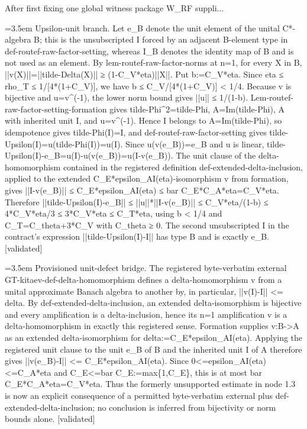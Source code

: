 \documentclass{article}
\newcommand{\step}[1]{\par\noindent\hangindent=3.5em\hangafter=1%
  \makebox[3.5em][l]{\textbf{#1.}}}
\newcommand{\steptag}[1]{\hfill{\small\textsf{[#1]}}}
\begin{document}
\begin{proofbox}{After first fixing one global witness package W\_RF suppli...}
\step{1.3} Upsilon-unit branch. Let e\_B denote the unit element of the unital C*-algebra B; this is the unsubscripted I forced by an adjacent B-element type in def-routef-raw-factor-setting, whereas I\_B denotes the identity map of B and is not used as an element. By lem-routef-raw-factor-norms at n=1, for every X in B, ||v(X)||=||tilde-Delta(X)|| ≥ (1-C\_V*eta)||X||. Put b:=C\_V*eta. Since eta ≤ rho\_T ≤ 1/[4*(1+C\_V)], we have b ≤ C\_V/[4*(1+C\_V)] < 1/4. Because v is bijective and u=v\textasciicircum{}(-1), the lower norm bound gives ||u|| ≤ 1/(1-b). Lem-routef-raw-factor-setting-formation gives tilde-Phi\textasciicircum{}2=tilde-Phi, A=Im(tilde-Phi), A with inherited unit I, and u=v\textasciicircum{}(-1). Hence I belongs to A=Im(tilde-Phi), so idempotence gives tilde-Phi(I)=I, and def-routef-raw-factor-setting gives tilde-Upsilon(I)=u(tilde-Phi(I))=u(I). Since u(v(e\_B))=e\_B and u is linear, tilde-Upsilon(I)-e\_B=u(I)-u(v(e\_B))=u(I-v(e\_B)). The unit clause of the delta-homomorphism contained in the registered definition def-extended-delta-inclusion, applied to the extended C\_E*epsilon\_AI(eta)-isomorphism v from formation, gives ||I-v(e\_B)|| ≤ C\_E*epsilon\_AI(eta) ≤ bar C\_E*C\_A*eta=C\_V*eta. Therefore ||tilde-Upsilon(I)-e\_B|| ≤ ||u||*||I-v(e\_B)|| ≤ C\_V*eta/(1-b) ≤ 4*C\_V*eta/3 ≤ 3*C\_V*eta ≤ C\_T*eta, using b < 1/4 and C\_T=C\_theta+3*C\_V with C\_theta ≥ 0. The second unsubscripted I in the contract's expression ||tilde-Upsilon(I)-I|| has type B and is exactly e\_B. \steptag{validated} \\[6pt]
\step{1.3.1} Provisioned unit-defect bridge. The registered byte-verbatim external GT-kitaev-def-delta-homomorphism defines a delta-homomorphism v from a unital approximate Banach algebra to another by, in particular, ||v(I)-I|| <= delta. By def-extended-delta-inclusion, an extended delta-isomorphism is bijective and every amplification is a delta-inclusion, hence its n=1 amplification v is a delta-homomorphism in exactly this registered sense. Formation supplies v:B->A as an extended delta-isomorphism for delta:=C\_E*epsilon\_AI(eta). Applying the registered unit clause to the unit e\_B of B and the inherited unit I of A therefore gives ||v(e\_B)-I|| <= C\_E*epsilon\_AI(eta). Since 0<=epsilon\_AI(eta)<=C\_A*eta and C\_E<=bar C\_E:=max\{1,C\_E\}, this is at most bar C\_E*C\_A*eta=C\_V*eta. Thus the formerly unsupported estimate in node 1.3 is now an explicit consequence of a permitted byte-verbatim external plus def-extended-delta-inclusion; no conclusion is inferred from bijectivity or norm bounds alone. \steptag{validated} \\[4pt]
\end{proofbox}
\end{document}

